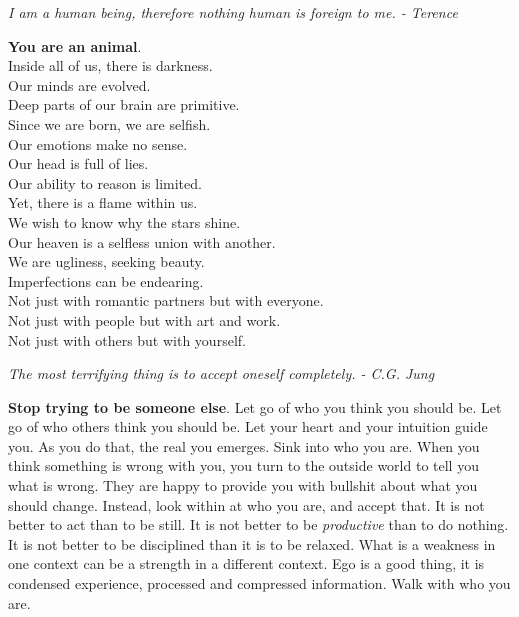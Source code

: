 \documentclass[a4paper,hidelinks]{article}
\begin{document}
\newpage

\begin{center}
\textit{
I am a human being, therefore nothing human is foreign to me. - Terence
}
\end{center}

\noindent
\textbf{You are an animal}.\\
Inside all of us, there is darkness.\\
Our minds are evolved.\\
Deep parts of our brain are primitive.\\
Since we are born, we are selfish.\\
Our emotions make no sense.\\
Our head is full of lies.\\
Our ability to reason is limited.\\
Yet, there is a flame within us.\\
We wish to know why the stars shine.\\
Our heaven is a selfless union with another.\\
We are ugliness, seeking beauty.\\
Imperfections can be endearing.\\
Not just with romantic partners but with everyone.\\
Not just with people but with art and work.\\
Not just with others but with yourself.\\

\newpage

\begin{center}
\textit{
The most terrifying thing is to accept oneself completely. - C.G. Jung
}
\end{center}

\textbf{Stop trying to be someone else}.
Let go of who you think you should be.
Let go of who others think you should be.
Let your heart and your intuition guide you.
As you do that, the real you emerges.
Sink into who you are.
When you think something is wrong with you, you turn to the outside world to tell you what is wrong.
They are happy to provide you with bullshit about what you should change.
Instead, look within at who you are, and accept that.
It is not better to act than to be still.
It is not better to be \textit{productive} than to do nothing.
It is not better to be disciplined than it is to be relaxed.
What is a weakness in one context can be a strength in a different context.
Ego is a good thing, it is condensed experience, processed and compressed information.
Walk with who you are.
\end{document}
